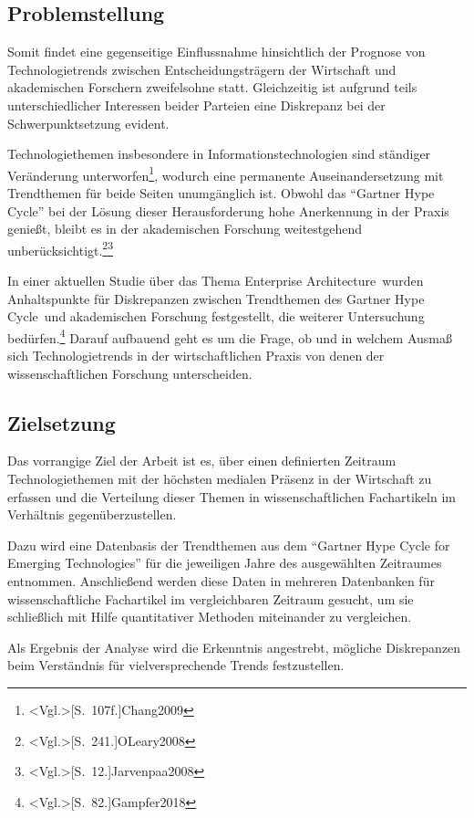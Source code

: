 \subsection{Problemstellung}
Somit findet eine gegenseitige Einflussnahme hinsichtlich der Prognose von Technologietrends zwischen Entscheidungsträgern der Wirtschaft und akademischen Forschern zweifelsohne statt. Gleichzeitig ist aufgrund teils unterschiedlicher Interessen beider Parteien eine Diskrepanz bei der Schwerpunktsetzung evident. 

Technologiethemen insbesondere in Informationstechnologien sind ständiger Ver\-änderung unterworfen\footnote{\citeNP<Vgl.>[S.~107f.]{Chang2009}}, wodurch eine permanente Auseinandersetzung mit Trend\-themen für beide Seiten unumgänglich ist. Obwohl das "`Gartner Hype Cycle"' bei der Lösung dieser Herausforderung hohe Anerkennung in der Praxis genießt, bleibt es in der akademischen Forschung weitestgehend unberücksichtigt.\footnote{\citeNP<Vgl.>[S.~241.]{OLeary2008}}\footnote{\citeNP<Vgl.>[S.~12.]{Jarvenpaa2008}}

In einer aktuellen Studie über das Thema \glqq Enterprise Architecture\grqq~wurden Anhaltspunkte für Diskrepanzen zwischen Trendthemen des \glqq Gartner Hype Cycle\grqq~und akademischen Forschung festgestellt, die weiterer Untersuchung bedürfen.\footnote{\citeNP<Vgl.>[S.~82.]{Gampfer2018}} Darauf aufbauend geht es um die Frage, ob und in welchem Ausmaß sich Technologietrends in der wirtschaftlichen Praxis von denen der wissenschaftlichen Forschung unterscheiden.

\subsection{Zielsetzung}
Das vorrangige Ziel der Arbeit ist es, über einen definierten Zeitraum Technologiethemen mit der höchsten medialen Präsenz in der Wirtschaft zu erfassen und die Verteilung dieser Themen in wissenschaftlichen Fachartikeln im Verhältnis gegenüberzustellen.

Dazu wird eine Datenbasis der Trendthemen aus dem "`Gartner Hype Cycle for Emerging Technologies"' für die jeweiligen Jahre des ausgewählten Zeitraumes entnommen. Anschließend werden diese Daten in mehreren Datenbanken für wissenschaftliche Fachartikel im vergleichbaren Zeitraum gesucht, um sie schließlich mit Hilfe quantitativer Methoden miteinander zu vergleichen.

Als Ergebnis der Analyse wird die Erkenntnis angestrebt, mögliche Diskrepanzen beim Verständnis für vielversprechende Trends festzustellen.


